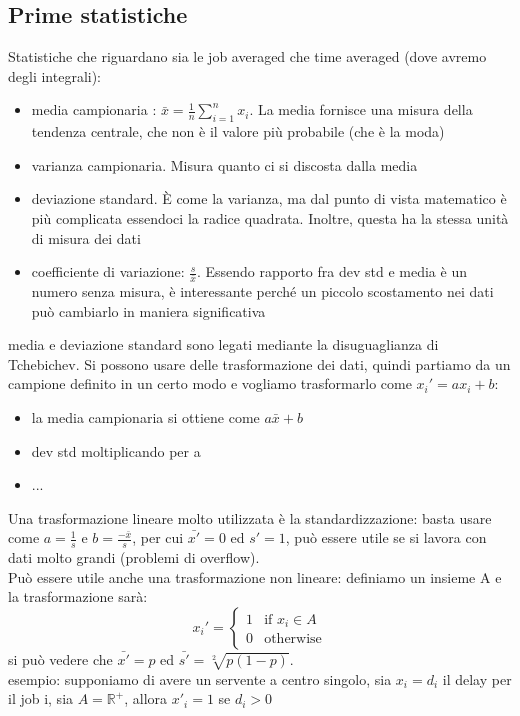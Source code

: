 \documentclass{article}
\begin{document}
\subsection{Prime statistiche}
Statistiche che riguardano sia le job averaged che time averaged (dove avremo degli integrali):
\begin{itemize}
\item media campionaria : $\bar{x} = \frac{1}{n} \sum\limits_{i=1}^{n} x_i$. La media fornisce una misura della tendenza centrale, che non è il valore più probabile (che è la moda)
\item varianza campionaria. Misura quanto ci si discosta dalla media 
\item deviazione standard. È come la varianza, ma dal punto di vista matematico è più complicata essendoci la radice quadrata. Inoltre, questa ha la stessa unità di misura dei dati
\item coefficiente di variazione: $\frac{s}{\bar{x}}$. Essendo rapporto fra dev std e media è un numero senza misura, è interessante perché un piccolo scostamento nei dati può cambiarlo in maniera significativa
\end{itemize}
media e deviazione standard sono legati mediante la disuguaglianza di Tchebichev. Si possono usare delle trasformazione dei dati, quindi partiamo da un campione definito in un certo modo e vogliamo trasformarlo come $x_i' = ax_i + b$:
\begin{itemize}
\item la media campionaria si ottiene come $a\bar{x} + b$
\item dev std moltiplicando per a
\item ...
\end{itemize}
Una trasformazione lineare molto utilizzata è la standardizzazione: basta usare come $a = \frac{1}{s}$ e $b = \frac{-\bar{x}}{s}$, per cui $\bar{x'} = 0$ ed $s' = 1$, può essere utile se si lavora con dati molto grandi (problemi di overflow).\\ Può essere utile anche una trasformazione non lineare: definiamo un insieme A e la trasformazione sarà:
\[
x_i' = 
\begin{cases}
1 & \text{if } x_i \in A \\
0 & \text{otherwise}
\end{cases}
\]
si può vedere che $\bar{x'} = p$ ed $\bar{s'} = \sqrt[2]{p(1-p)}$.\\ esempio: supponiamo di avere un servente a centro singolo, sia $x_i = d_i$ il delay per il job i, sia $A = \mathbb{R}^+$, allora $x'_i = 1$ se $d_i > 0$\\
\end{document}
